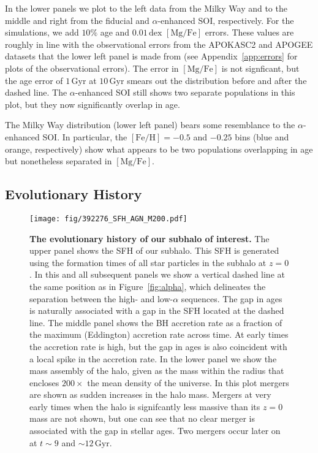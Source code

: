 \documentclass[linenumbers, twocolumn]{aastex631}
\newcommand{\Gyr}{\ensuremath{\textrm{Gyr}}}
\newcommand{\FeH}{\ensuremath{[\textrm{Fe}/\textrm{H}]}}
\newcommand{\MgFe}{\ensuremath{[\textrm{Mg}/\textrm{Fe}]}}
\newcommand{\dex}{\ensuremath{\textrm{dex}}}
\begin{document}
In the lower panels we plot to the left data from the Milky Way and to the middle and right from the fiducial and $\alpha$-enhanced SOI, respectively. For the simulations, we add $10\%$ age and $0.01\,\dex$ \MgFe{} errors. These values are roughly in line with the observational errors from the APOKASC2 and APOGEE datasets that the lower left panel is made from (see Appendix~\ref{app:errors} for plots of the observational errors). The error in \MgFe{} is not signficant, but the age error of $1\,\Gyr$ at $10\,\Gyr$ smears out the distribution before and after the dashed line. The $\alpha$-enhanced SOI still shows two separate populations in this plot, but they now significantly overlap in age.

The Milky Way distribution (lower left panel) bears some resemblance to the $\alpha$-enhanced SOI. In particular, the $\FeH=-0.5$ and $-0.25$ bins (blue and orange, respectively) show what appears to be two populations overlapping in age but nonetheless separated in \MgFe{}.

\subsection{Evolutionary History}\label{ssec:evol}

\begin{figure}
  \centering
  \texttt{[image: fig/392276\_SFH\_AGN\_M200.pdf]}
  \caption{\textbf{The evolutionary history of our subhalo of interest.} The upper panel shows the SFH of our subhalo. This SFH is generated using the formation times of all star particles in the subhalo at $z=0$. In this and all subsequent panels we show a vertical dashed line at the same position as in Figure~\ref{fig:alpha}, which delineates the separation between the high- and low-$\alpha$ sequences. The gap in ages is naturally associated with a gap in the SFH located at the dashed line. The middle panel shows the BH accretion rate as a fraction of the maximum (Eddington) accretion rate across time. At early times the accretion rate is high, but the gap in ages is also coincident with a local spike in the accretion rate. In the lower panel we show the mass assembly of the halo, given as the mass within the radius that encloses $200\times$ the mean density of the universe. In this plot mergers are shown as sudden increases in the halo mass. Mergers at very early times when the halo is signifcantly less massive than its $z=0$ mass are not shown, but one can see that no clear merger is associated with the gap in stellar ages. Two mergers occur later on at $t\sim9$ and $\sim12\,\Gyr$.}
  \label{fig:history}
\end{figure}
\end{document}
